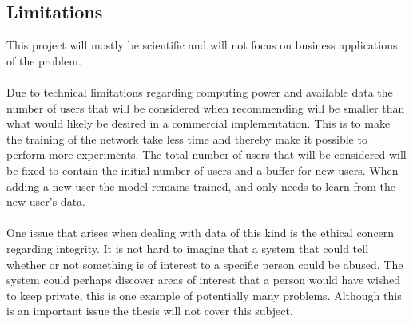 \subsection{Limitations}
This project will mostly be scientific and will not focus on business applications of the problem.
\\\\
Due  to  technical  limitations  regarding  computing  power  and  available  data  the number of users that will be considered when recommending will be smaller than what would likely be desired in a commercial implementation. This  is  to  make  the training  of  the  network  take  less  time  and  thereby make it possible to perform more experiments. The total number of users that will be considered will be fixed to contain the initial number of users and a buffer for new users. When adding a new user the model remains trained, and only needs to learn from the new user’s data.
\\\\
One issue that arises when dealing with data of this kind is the ethical concern regarding integrity. It is not hard to imagine that a system that could tell whether or not something is of interest to a specific person could be abused. The system could perhaps discover areas of interest that a person would have wished to keep private, this is one example of potentially many problems. Although this is an important issue the thesis will not cover this subject. 